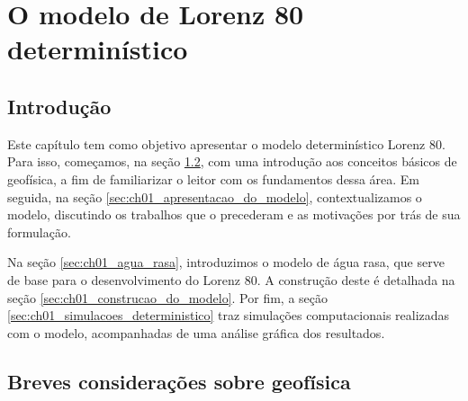 \chapter{O modelo de Lorenz 80 determinístico} \label{cap:ch01_lorenz_deterministico}

\section{Introdução} \label{sec:ch01_introducao}
Este capítulo tem como objetivo apresentar o modelo determinístico Lorenz 80. Para isso, começamos, na seção \ref{sec:ch01_geofisica}, com uma introdução aos conceitos básicos de geofísica, a fim de familiarizar o leitor com os fundamentos dessa área. Em seguida, na seção \ref{sec:ch01_apresentacao_do_modelo}, contextualizamos o modelo, discutindo os trabalhos que o precederam e as motivações por trás de sua formulação.

Na seção \ref{sec:ch01_agua_rasa}, introduzimos o modelo de água rasa, que serve de base para o desenvolvimento do Lorenz 80. A construção deste é detalhada na seção \ref{sec:ch01_construcao_do_modelo}. Por fim, a seção \ref{sec:ch01_simulacoes_deterministico} traz simulações computacionais realizadas com o modelo, acompanhadas de uma análise gráfica dos resultados.

\section{Breves considerações sobre geofísica} \label{sec:ch01_geofisica}

